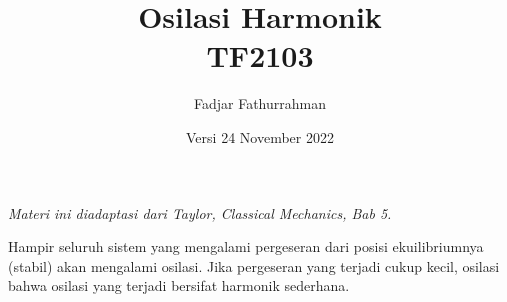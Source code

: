 




\title{Osilasi Harmonik \\
TF2103}
\author{Fadjar Fathurrahman}
\date{Versi 24 November 2022}
\maketitle

\emph{Materi ini diadaptasi dari Taylor, Classical Mechanics, Bab 5.}

Hampir seluruh sistem yang mengalami pergeseran dari posisi ekuilibriumnya
(stabil) akan mengalami osilasi.
Jika pergeseran yang terjadi cukup kecil, osilasi
bahwa osilasi yang terjadi bersifat harmonik sederhana.










